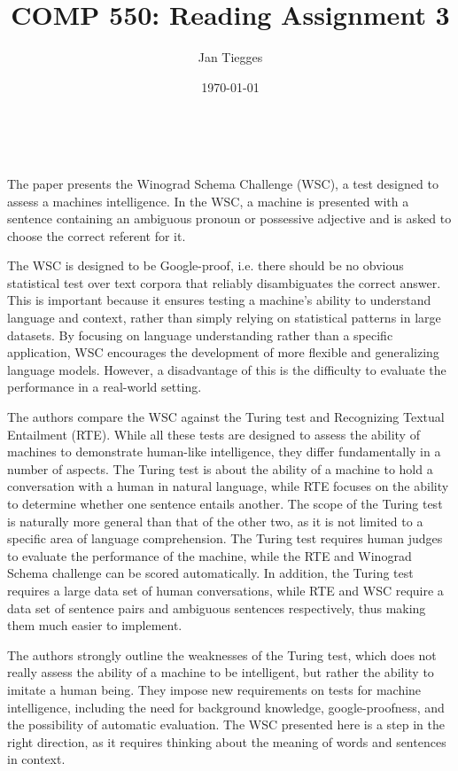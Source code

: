 \documentclass[12pt]{article}
\title{\textbf{COMP 550: Reading Assignment 3}}
\author{Jan Tiegges}
\date{\today}
\makeatletter
\renewcommand{\maketitle}{%
  \begin{center}
    {\large\bfseries\MakeUppercase\@title}\\[1ex]
    \MakeUppercase{\@author \hspace{2em} \@date}
  \end{center}
}
\makeatother
\begin{document}
\maketitle


The paper presents the Winograd Schema Challenge (WSC), a test designed to assess a machines intelligence. In the WSC, a machine is presented with a sentence containing an ambiguous pronoun or possessive adjective and is asked to choose the correct referent for it.

The WSC is designed to be Google-proof, i.e. there should be no obvious statistical test over text corpora that reliably disambiguates the correct answer. This is important because it ensures testing a machine's ability to understand language and context, rather than simply relying on statistical patterns in large datasets. By focusing on language understanding rather than a specific application, WSC encourages the development of more flexible and generalizing language models. However, a disadvantage of this is the difficulty to evaluate the performance in a real-world setting. 

The authors compare the WSC against the Turing test and Recognizing Textual Entailment (RTE). While all these tests are designed to assess the ability of machines to demonstrate human-like intelligence, they differ fundamentally in a number of aspects. The Turing test is about the ability of a machine to hold a conversation with a human in natural language, while RTE focuses on the ability to determine whether one sentence entails another. The scope of the Turing test is naturally more general than that of the other two, as it is not limited to a specific area of language comprehension. The Turing test requires human judges to evaluate the performance of the machine, while the RTE and Winograd Schema challenge can be scored automatically. In addition, the Turing test requires a large data set of human conversations, while RTE and WSC require a data set of sentence pairs and ambiguous sentences respectively, thus making them much easier to implement.

The authors strongly outline the weaknesses of the Turing test, which does not really assess the ability of a machine to be intelligent, but rather the ability to imitate a human being. They impose new requirements on tests for machine intelligence, including the need for background knowledge, google-proofness, and the possibility of automatic evaluation. The WSC presented here is a step in the right direction, as it requires thinking about the meaning of words and sentences in context.
\end{document}
